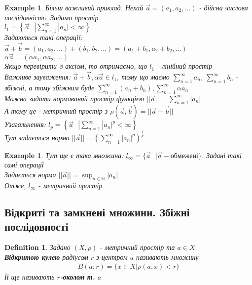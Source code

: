 \documentclass[a4paper, 14pt]{extarticle}
\def\huge{\displaystyle}
\theoremstyle{theoremdd}
\theoremstyle{theoremdd}
\newtheorem{definition}[theorem]{Definition}
\theoremstyle{theoremdd}
\theoremstyle{theoremdd}
\newtheorem{example}[theorem]{Example}
\theoremstyle{theoremdd}
\theoremstyle{theoremdd}
\theoremstyle{theoremdd}
\theoremstyle{theoremdd}
\begin{document}
\begin{example} Більш важливий приклад. Нехай $\vec{a} = (a_1,a_2,\dots)$ - дійсна числова послідовність. Задамо простір\\
$l_1 = \left\{ \vec{a} \text{ } |  \huge\sum_{n=1}^\infty |a_n| < \infty \right\}$\\
Задаються такі операції:\\
$\vec{a} + \vec{b} = (a_1,a_2,\dots) + (b_1,b_2,\dots) = (a_1+b_1,a_2+b_2,\dots)$\\
$\alpha \vec{a} = (\alpha a_1, \alpha a_2, \dots)$\\
Якщо перевірити 8 аксіом, то отримаємо, що $l_1$ - лінійний простір\\
Важливе зауваження: $\vec{a}+\vec{b}, \alpha \vec{a} \in l_1$, тому що маємо $\huge\sum_{n=1}^\infty a_n$, $\huge\sum_{n=1}^\infty b_n$ - збіжні, а тому збіжним буде $\huge \sum_{n=1}^\infty (a_n+b_n), \sum_{n=1}^\infty \alpha a_n$\\
Можна задати нормований простір функцією $|| \vec{a} || = \huge \sum_{n=1}^\infty |a_n|$\\
А тому це - метричний простір з $\rho(\vec{a}, \vec{b}) = ||\vec{a} - \vec{b}||$
\bigskip \\
Узагальнення: $l_p = \left\{ \vec{a} \text{ } | \huge\sum_{n=1}^\infty |a_n|^p < \infty \right\}$\\
Тут задається норма $||\vec{a}|| = \left( \huge\sum_{n=1}^\infty |a_n|^p \right)^{\frac{1}{p}}$
\end{example}

\begin{example}
Тут ще є така множина: $l_{\infty} = \{ \vec{a} \text{ } | \vec{a} - \text{обмежені} \}$. Задані такі самі операції\\
Задається норма $||\vec{a}|| = \huge \sup_{n \in \mathbb{N}} |a_n|$\\
Отже, $l_{\infty}$ - метричний простір
\end{example}

\subsection{Відкриті та замкнені множини. Збіжні послідовності}
\begin{definition}
Задано $(X,\rho)$ - метричний простір та $a \in X$\\
\textbf{Відкритою кулею} радіусом $r$ з центром $a$ називають множину
\begin{align*}
B(a;r) = \{x \in X | \rho(a,x) < r\}
\end{align*}
Її ще називають $r$\textbf{-околом т.} $a$
\end{definition}
\end{document}
